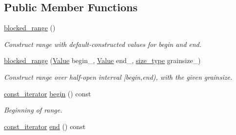 \subsection*{Public Member Functions}
\begin{DoxyCompactItemize}
\item 
\hyperlink{classtbb_1_1blocked__range_aad176ab2cbd0bd73c3c2065761af3ccc}{blocked\+\_\+range} ()
\begin{DoxyCompactList}\small\item\em Construct range with default-\/constructed values for begin and end. \end{DoxyCompactList}\item 
\hypertarget{classtbb_1_1blocked__range_a49a97576004711b7159170fcaf488e4e}{}\hyperlink{classtbb_1_1blocked__range_a49a97576004711b7159170fcaf488e4e}{blocked\+\_\+range} (\hyperlink{structValue}{Value} begin\+\_\+, \hyperlink{structValue}{Value} end\+\_\+, \hyperlink{classtbb_1_1blocked__range_a89b300cecd9d617e4ee801c786756e55}{size\+\_\+type} grainsize\+\_)\label{classtbb_1_1blocked__range_a49a97576004711b7159170fcaf488e4e}

\begin{DoxyCompactList}\small\item\em Construct range over half-\/open interval \mbox{[}begin,end), with the given grainsize. \end{DoxyCompactList}\item 
\hypertarget{classtbb_1_1blocked__range_ae225fa10454b0fa33533dfb56f5060a2}{}\hyperlink{classtbb_1_1blocked__range_ad56ca70af46acf8870b4970d8a809791}{const\+\_\+iterator} \hyperlink{classtbb_1_1blocked__range_ae225fa10454b0fa33533dfb56f5060a2}{begin} () const \label{classtbb_1_1blocked__range_ae225fa10454b0fa33533dfb56f5060a2}

\begin{DoxyCompactList}\small\item\em Beginning of range. \end{DoxyCompactList}\item 
\hypertarget{classtbb_1_1blocked__range_a99f829599d3e51b181a30b4cd57b06c6}{}\hyperlink{classtbb_1_1blocked__range_ad56ca70af46acf8870b4970d8a809791}{const\+\_\+iterator} \hyperlink{classtbb_1_1blocked__range_a99f829599d3e51b181a30b4cd57b06c6}{end} () const \label{classtbb_1_1blocked__range_a99f829599d3e51b181a30b4cd57b06c6}


\end{DoxyCompactItemize}

